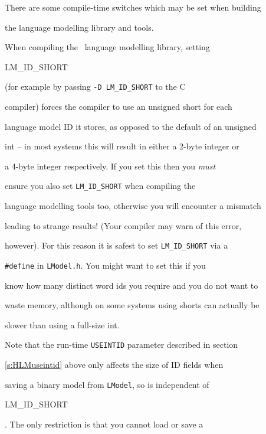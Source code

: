 

There are some compile-time switches which may be set when building


the language modelling library and tools.










When compiling the \HTK\ language modelling library, setting {\tt


LM\_ID\_SHORT} (for example by passing {\tt -D LM\_ID\_SHORT} to the C


compiler) forces the compiler to use an unsigned short for each


language model ID it stores, as opposed to the default of an unsigned


int -- in most systems this will result in either a 2-byte integer or


a 4-byte integer respectively.  If you set this then you {\it must}


ensure you also set {\tt LM\_ID\_SHORT} when compiling the \HTK\


language modelling tools too, otherwise you will encounter a mismatch


leading to strange results!  (Your compiler may warn of this error,


however).  For this reason it is safest to set {\tt LM\_ID\_SHORT} via a


{\tt \#define} in {\tt LModel.h}.  You might want to set this if you


know how many distinct word ids you require and you do not want to


waste memory, although on some systems using shorts can actually be


slower than using a full-size int.





Note that the run-time {\tt USEINTID} parameter described in section


\ref{s:HLMuseintid} above only affects the size of ID fields when


saving a binary model from {\tt LModel}, so is independent of {\tt


LM\_ID\_SHORT}.  The only restriction is that you cannot load or save a



